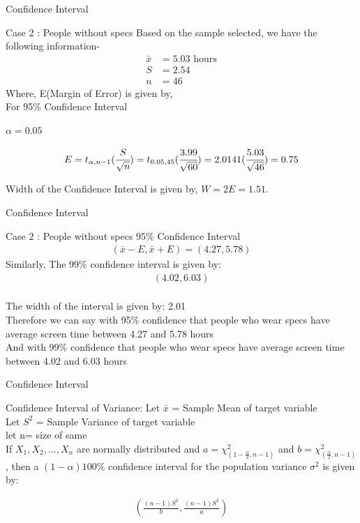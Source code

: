 \documentclass{beamer}
\begin{document}
\begin{frame}{Confidence Interval}
\begin{block}{Case 2 : People without specs}
Based on the sample selected, we have the following information-
\begin{align}
    \bar{x} &=  5.03 \text{ hours}\\ 
    S &= 2.54\\
    n &= 46
\end{align}
Where, E(Margin of Error) is given by,
\\For 95\% Confidence Interval
\begin{center} 
    $\alpha = 0.05$
\end{center}
\begin{align}
    E =t_{{\alpha}, n-1}(\cfrac{S}{\sqrt{n}})=t_{{0.05}, 45}(\cfrac{3.99}{\sqrt{60}})=2.0141(\cfrac{5.03}{\sqrt{46}})=0.75
\end{align}

 Width of the Confidence Interval is given by, $W = 2E= 1.51$.
\end{block}
\end{frame}
\begin{frame}{Confidence Interval}
\begin{block}{Case 2 : People without specs}
95\% Confidence Interval
 \begin{align}
      (\bar{x} - E,\bar{x} + E) = (4.27,5.78)
 \end{align}
 Similarly, The 99\% confidence interval is given by: 
 \begin{align}(4.02,6.03)\end{align} \\The width of the interval is given by: 2.01
 \newline
\\Therefore we can say with 95\% confidence that people who wear specs have average screen time between 4.27 and 5.78 hours
 \newline
\\And with 99\% confidence that people who wear specs have average screen time between 4.02 and 6.03 hours
\end{block}
\end{frame}


\begin{frame}{Confidence Interval}
\begin{block}{Confidence Interval of Variance:}
Let $\bar{x}$ = Sample Mean of target variable  \\
Let $S^2$ = Sample Variance of target variable \\
let  n= size of same  
\\If $X_{1}, X_{2}, ..., X_{n}$ are normally distributed and $a = \chi^2_{(1-\frac{\alpha}{2},n-1)}$ and $b = \chi^2_{(\frac{\alpha}{2},n-1)}$, then a $(1-\alpha)100\%$ confidence interval for the population variance $\sigma^2$ is given by:

\begin{align}
\left(\frac{(n-1)S^2}{b},\frac{(n-1)S^2}{a}\right)
\end{align}
\end{block}
\end{frame}
\end{document}

